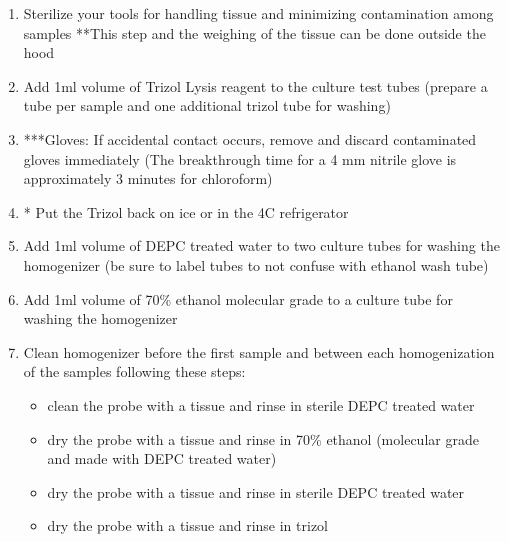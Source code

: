 \documentclass[11pt, oneside]{article}
\begin{document}
		\begin{enumerate}
			\itemsep0em
			\item Sterilize your tools for handling tissue and minimizing contamination among samples **This step and the weighing of the tissue can 				be done outside the hood
			\item Add 1ml volume of Trizol Lysis reagent to the culture test tubes (prepare a tube per sample and one additional trizol tube for washing)
			\item ***Gloves: If accidental contact occurs, remove and discard contaminated gloves immediately (The breakthrough time for a 4 mm 				nitrile glove is approximately 3 minutes for chloroform)
			\item * Put the Trizol back on ice or in the 4C refrigerator
			\item Add 1ml volume of DEPC treated water to two culture tubes for washing the homogenizer (be sure to label tubes to not confuse with 			ethanol wash tube)
			\item Add 1ml volume of 70\% ethanol molecular grade to a culture tube for washing the homogenizer
			\item Clean homogenizer before the first sample and between each homogenization of the samples following these steps:
				
				\begin{itemize}
					\itemsep0em 
					\item clean the probe with a tissue and rinse in sterile DEPC treated water
					\item dry the probe with a tissue and rinse in 70\% ethanol (molecular grade and made with DEPC treated water)
					\item dry the probe with a tissue and rinse in sterile DEPC treated water
					\item dry the probe with a tissue and rinse in trizol 
				\end{itemize}
				

\end{enumerate}
\end{document}
